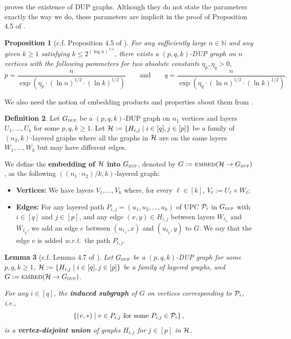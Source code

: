 \documentclass[11pt]{article}
\newtheorem{lemma}{Lemma}[section]
\newtheorem{proposition}[lemma]{Proposition}
\theoremstyle{definition}
\newtheorem{mddefinition}[lemma]{Definition}
\newenvironment{Definition}{\begin{mdframed}[hidealllines=false,innerleftmargin=10pt,backgroundcolor=white!10,innertopmargin=5pt,innerbottommargin=5pt,roundcorner=10pt]\begin{mddefinition}}{\end{mddefinition}\end{mdframed}}
\renewcommand{\leq}{\leqslant}
\renewcommand{\geq}{\geqslant}
\newcommand{\paren}[1]{\ensuremath{\left(#1\right)}\xspace}
\newcommand{\IN}{\ensuremath{\mathbb{N}}}
\newcommand{\set}[1]{\ensuremath{\left\{ #1 \right\}}}
\begin{document}
\cite{AssadiKNS24} proves the existence of DUP graphs. Although they do not state the parameters exactly the way we do, these parameters are implicit in the proof of Proposition 4.5 of \cite{AssadiKNS24}.

\begin{proposition}[c.f. Proposition 4.5 of \cite{AssadiKNS24}]\label{prop:dup}
	For any sufficiently large $n \in \IN$ and any given $k \geq 1$ satisfying $k \leq 2^{(\log{n})^{1/4}}$, there exists a $(p,q,k)$-DUP graph on $n$ vertices with the following parameters for two absolute constants $\eta_p,\eta_q > 0$,
	\[
	p = \frac{n}{\exp\paren{\eta_p \cdot (\ln{n})^{1/2} \cdot (\ln{k})^{1/2}}} \qquad \text{and} \qquad q = \frac{n}{\exp\paren{\eta_q \cdot (\ln{n})^{1/2} \cdot (\ln{k})^{1/2}}}.
	\]
\end{proposition}

We also need the notion of embedding products and properties about them from \cite{AssadiKNS24}.
\begin{Definition}\label{def:embed}
	Let $G_{\textsc{dup}}$ be a $(p,q,k)$-DUP graph on $n_1$ vertices and layers $U_1,\ldots,U_{k}$ for some $p,q,k \geq 1$. 
	Let $\cH := \set{H_{i,j} \mid i \in [q] , j \in [p]}$ be a family of $(n_2,k)$-layered graphs where all the graphs in $\mathcal{H}$ are on the same layers $W_1,\ldots,W_{k}$ but may have different edges. 
	
	We define the \textbf{embedding of $\mathcal{H}$ into} $G_{\textsc{dup}}$, denoted by $G:=\textnormal{\textsc{embed}}(\mathcal{H} \rightarrow G_{\textsc{dup}})$, as the following $((n_1 \cdot n_2)/k , k)$-layered graph: 
	\begin{itemize}[leftmargin=10pt]
		\item \textbf{Vertices:} We have layers $V_1,\ldots,V_{k}$ where, for every $\ell \in [k]$, $V_\ell := U_\ell \times W_\ell$; 
		\item \textbf{Edges:} For any layered path $P_{i,j} = (u_1, u_2, ..., u_{k})$ of UPC $\mathcal{P}_i$ in $G_{\textsc{dup}}$ with $i \in [q]$ and $j \in [p]$, and any edge $(x,y) \in H_{i,j}$ between layers $W_{\ell_x}$ and $W_{\ell_y}$, 
		we add an edge $e$ between $(u_{\ell_x},x)$ and $(u_{\ell_y},y)$ to $G$. We say that the edge $e$ is added \emph{w.r.t.}\ the path $P_{i,j}$. 
	\end{itemize}
\end{Definition}

\begin{lemma}[c.f. Lemma 4.7 of \cite{AssadiKNS24}]\label{lem:embed-induced}
	Let $G_{\textsc{dup}}$ be a $(p,q,k)$-DUP graph for some $p,q,k \geq 1$, $\cH := \set{H_{i,j} \mid i \in [q] , j \in [p]}$ be a family of layered graphs, and $G := \textnormal{\textsc{embed}}(\mathcal{H} \rightarrow G_{\textsc{dup}})$. 
	
	For any $i \in [q]$, the \textbf{\emph{induced subgraph}} of $G$ on vertices corresponding to $\mathcal{P}_i$, i.e., $$\set{(v,*) \mid v \in P_{i,j}~\text{for some $P_{i,j} \in \cP_i$}},$$ is a \emph{\textbf{vertex-disjoint union}} of graphs $H_{i,j}$ for $j \in [p]$ in $\mathcal{H}$. 
\end{lemma}
\end{document}
